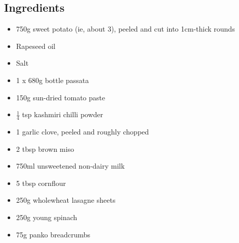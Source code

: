 \documentclass{book}
\begin{document}
\subsection*{Ingredients}
\begin{itemize}
\item 750g sweet potato (ie, about 3), peeled and cut into 1cm-thick rounds 
\item Rapeseed oil 
\item Salt 
\item 1 x 680g bottle passata 
\item 150g sun-dried tomato paste 
\item $\frac{1}{4}$ tsp kashmiri chilli powder 
\item 1 garlic clove, peeled and roughly chopped
\item 2 tbsp brown miso
\item 750ml unsweetened non-dairy milk
\item 5 tbsp cornflour 
\item 250g wholewheat lasagne sheets 
\item 250g young spinach 
\item 75g panko breadcrumbs
\end{itemize}
\end{document}
